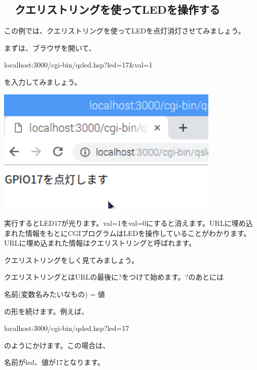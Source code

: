 \clearpage\subsection*{\theExercise　クエリストリングを使ってLEDを操作する}
\addtocounter{Exercise}{-1}\label{E:QS}

この例では、クエリストリングを使ってLEDを点灯消灯させてみましょう。


\bigskip

まずは、ブラウザを開いて、

localhost:3000/cgi-bin/qsled.hsp?led=17\&val=1

を入力してみましょう。

%


\centering
\includegraphics[width=0.8\textwidth]{text07-img/ome7-img055.png}
\flushleft

実行するとLED17が光ります。val=1をval=0にすると消えます。URLに埋め込まれた情報をもとにCGIプログラムはLEDを操作していることがわかります。URLに埋め込まれた情報はクエリストリングと呼ばれます。


\bigskip

クエリストリングをしく見てみましょう。

クエリストリングとはURLの最後に?をつけて始めます。?のあとには

名前(変数名みたいなもの) = 値

の形を続けます。例えば、

localhost:3000/cgi-bin/qsled.hsp?led=17

のようにかけます。この場合は、

名前がled、値が17となります。

